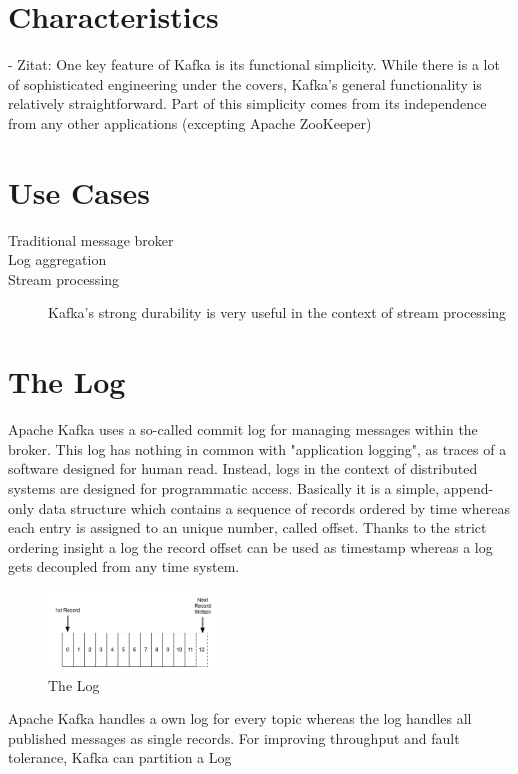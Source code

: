 \section{Characteristics}
- Zitat: One key feature of Kafka is its functional simplicity. While there is a
lot of sophisticated engineering under the covers, Kafka’s general functionality
is relatively straightforward. Part of this simplicity comes from its
independence from any other applications (excepting Apache ZooKeeper)

\section{Use Cases}
\begin{description}
    \item [Traditional message broker]
    \item [Log aggregation]
    \item [Stream processing] Kafka's strong durability is very useful in the
        context of stream processing
\end{description}

\section{The Log}
Apache Kafka uses a so-called commit log for managing messages within the
broker. This log has nothing in common with "application logging", as traces of
a software designed for human read. Instead, logs in the context of distributed systems
are designed for programmatic access. Basically it is a simple, append-only data
structure which contains a sequence of records ordered by time whereas each
entry is assigned to an unique number, called offset. Thanks to the strict
ordering insight a log the record offset can be used as timestamp whereas a log
gets decoupled from any time system.

\begin{figure}[H]
    \centering
    \includegraphics[width=0.4\textwidth]{images/log.png}
    \caption{The  Log}
    \label{fig:the-log}
\end{figure}

Apache Kafka handles a own log for every
topic whereas the log handles all published messages as single records. For
improving throughput and fault tolerance, Kafka can partition a Log

